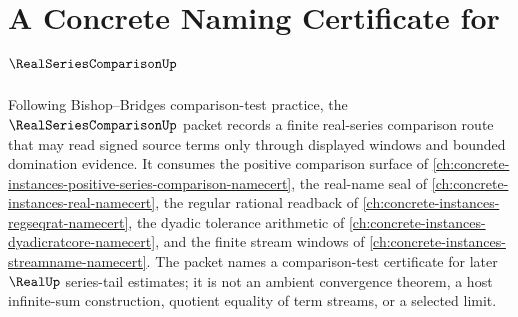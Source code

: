 \chapter{A Concrete Naming Certificate for $\RealSeriesComparisonUp$}
\label{ch:concrete-instances-real-series-comparison-namecert}

Following Bishop--Bridges comparison-test practice, the $\RealSeriesComparisonUp$ packet records a finite real-series comparison route that may read signed source terms only through displayed windows and bounded domination evidence. It consumes the positive comparison surface of \autoref{ch:concrete-instances-positive-series-comparison-namecert}, the real-name seal of \autoref{ch:concrete-instances-real-namecert}, the regular rational readback of \autoref{ch:concrete-instances-regseqrat-namecert}, the dyadic tolerance arithmetic of \autoref{ch:concrete-instances-dyadicratcore-namecert}, and the finite stream windows of \autoref{ch:concrete-instances-streamname-namecert}. The packet names a comparison-test certificate for later $\RealUp$ series-tail estimates; it is not an ambient convergence theorem, a host infinite-sum construction, quotient equality of term streams, or a selected limit.

